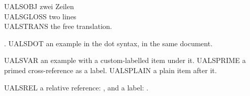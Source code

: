 \ea \gll UALSOBJ zwei Zeilen\\
        UALSGLOSS two lines\\
\glt UALSTRANS the free translation.
\z

\ex. UALSDOT an example in the dot syntax, in the same document.

\begin{exe}
\ex UALSVAR an example with a custom-labelled item under it.
 UALSPRIME a primed cross-reference as a label.
\ex UALSPLAIN a plain item after it.
\end{exe}

UALSREL a relative reference: \pLast, and a label: .

